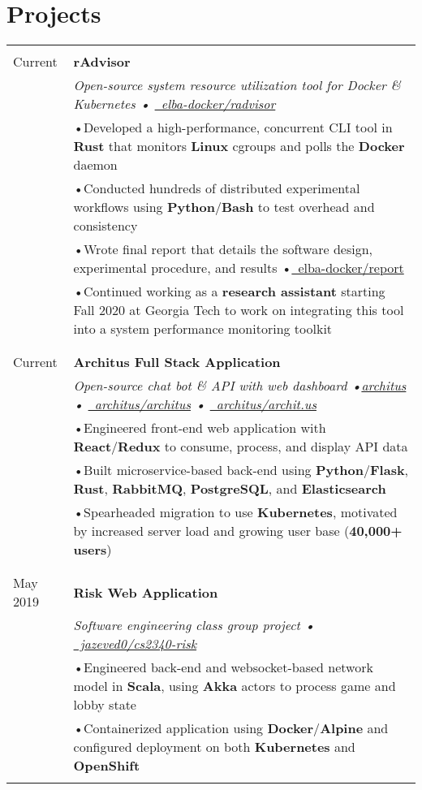 \documentclass[a4paper,11pt]{article}
\newcommand{\lcolwidth}{2.2cm}
\newcommand{\lcolwidthinner}{2.1cm}
\newcommand{\rcolwidth}{16.2cm}
\newenvironment{rsection}[1]
  {
    \section{#1}
    \begin{tabular}{>{\raggedleft\arraybackslash}p{\lcolwidth}|p{\rcolwidth}}
   } {
    \\\multicolumn{2}{c}{} \\[-10pt]
    \end{tabular}
  }
\newcommand{\rheader}[2]{
    \multirow[t]{2}{*}{
        \begin{minipage}[t]{\lcolwidthinner}
            \begin{flushright}
                \textsc{#1}
            \end{flushright}
        \end{minipage}
    } & \textbf{#2}
}
\newcommand{\rdesc}[1]{
  \\[-2pt]&\small{\emph{#1}\vspace{1pt} }
}
\newcommand{\ritem}[2][ •\hspace{3pt}]{\\[-2pt]& \footnotesize{#1#2}}
\newcommand{\rskip}{\\\multicolumn{2}{c}{} \\[-5pt]}
\newcommand{\rdot}{\xspace\hspace{0pt}•\hspace{3pt}\xspace}
\begin{document}
\begin{rsection}{Projects}
  \rheader{Feb 2020 -\\[-1pt] Current}{rAdvisor}
  \rdesc{Open-source system resource utilization tool for Docker \& Kubernetes
    {\normalfont \rdot
    \href{https://github.com/elba-docker/radvisor}{\faGithub\ elba-docker/radvisor}}}
  \ritem{Developed a high-performance, concurrent CLI tool in \textbf{Rust}
    that monitors \textbf{Linux} cgroups and polls the \textbf{Docker} daemon}
  \ritem{Conducted hundreds of distributed experimental workflows
    using \textbf{Python}/\textbf{Bash} to test overhead and consistency}
  \ritem{Wrote final report that details the software design, experimental procedure, and results
    \rdot \href{https://github.com/elba-docker/report}{\faGithub\ elba-docker/report}}
  \ritem{Continued working as a \textbf{research assistant} starting Fall 2020
    at Georgia Tech to work on integrating this tool into a system
    \newline\hphantom{t\,} performance monitoring toolkit}
  \rskip

  \rheader{May 2019 -\\[-1pt] Current}{Architus Full Stack Application}
  \rdesc{Open-source chat bot \& API with web dashboard
    {\normalfont \rdot \href{https://archit.us/}{architus} \rdot
        \href{https://github.com/architus/architus}{\faGithub\ architus/architus} \rdot
        \href{https://github.com/architus/archit.us}{\faGithub\ architus/archit.us}}}
  \ritem{Engineered front-end web application with \textbf{React}/\textbf{Redux}
    to consume, process, and display API data}
  \ritem{Built microservice-based back-end using \textbf{Python}/\textbf{Flask},
    \textbf{Rust}, \textbf{RabbitMQ}, \textbf{PostgreSQL}, and \textbf{Elasticsearch}}
  \ritem{Spearheaded migration to use \textbf{Kubernetes}, motivated by
    increased server load and growing user base (\textbf{40,000+ users})}
  \rskip

  \rheader{Jan 2019 -\\[-1pt] May 2019}{Risk Web Application}
  \rdesc{Software engineering class group project
    {\normalfont \rdot
    \href{https://github.com/jazeved0/cs2340-risk}{\faGithub\ jazeved0/cs2340-risk}}}
  \ritem{Engineered back-end and websocket-based network model in \textbf{Scala},
    using \textbf{Akka} actors to process game and lobby state}
  \ritem{Containerized application using \textbf{Docker}/\textbf{Alpine}
    and configured deployment on both \textbf{Kubernetes} and \textbf{OpenShift}}
\end{rsection}
\end{document}
